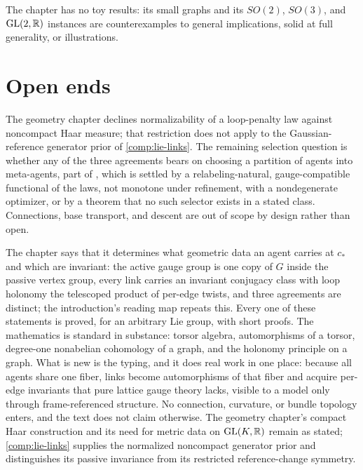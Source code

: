 The chapter has no toy results: its small graphs and its $SO(2)$, $SO(3)$, and $\mathrm{GL}(2,\mathbb R)$ instances are
counterexamples to general implications, solid at full generality, or illustrations.

\section{Open ends}
\label{comp:ch02-open}

The geometry chapter declines normalizability of a loop-penalty law against noncompact Haar measure;
that restriction does not apply to the Gaussian-reference generator prior of \cref{comp:lie-links}.
The remaining selection question is whether any of the three agreements bears on
choosing a partition of agents into meta-agents, part of , which is settled by a
relabeling-natural, gauge-compatible functional of the laws, not monotone under refinement, with a nondegenerate
optimizer, or by a theorem that no such selector exists in a stated class. Connections, base transport, and
descent are out of scope by design rather than open.

\begin{verdictbox}{\DELIVERED}
The chapter says that it determines what geometric data an agent carries at $c_*$ and which are invariant: the
active gauge group is one copy of $G$ inside the passive vertex group, every link carries an invariant
conjugacy class with loop holonomy the telescoped product of per-edge twists, and three agreements are
distinct; the introduction's reading map repeats this. Every one of these statements is proved, for an
arbitrary Lie group, with short proofs. The mathematics is standard in substance: torsor algebra, automorphisms
of a torsor, degree-one nonabelian cohomology of a graph, and the holonomy principle on a graph. What is new is
the typing, and it does real work in one place: because all agents share one fiber, links become automorphisms
of that fiber and acquire per-edge invariants that pure lattice gauge theory lacks, visible to a model only
through frame-referenced structure. No connection, curvature, or bundle topology enters, and the text does not
claim otherwise. The geometry chapter's compact Haar construction and its need for metric data on
$\mathrm{GL}(K,\mathbb R)$ remain as stated; \cref{comp:lie-links} supplies the normalized noncompact generator
prior and distinguishes its passive invariance from its restricted reference-change symmetry.
\end{verdictbox}



